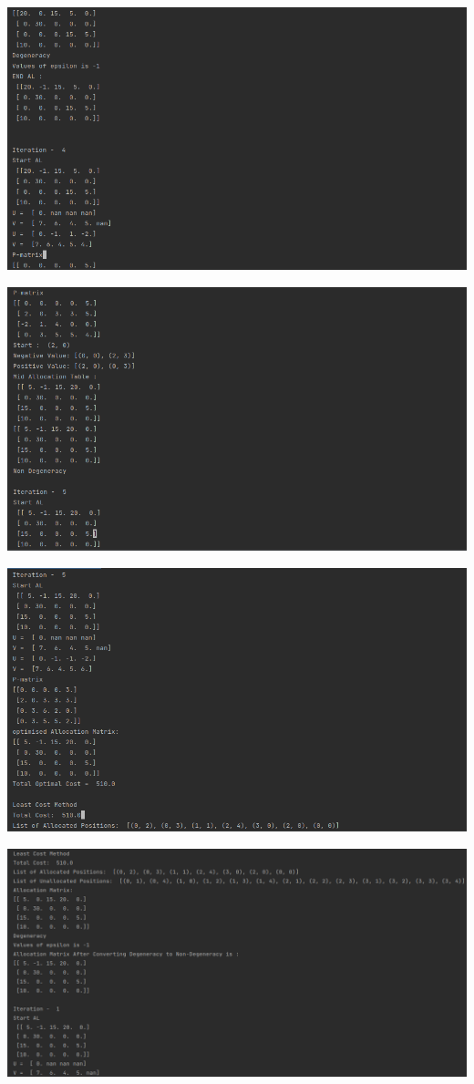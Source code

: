 \documentclass[12pt, letterpaper, twoside]{book}
\begin{document}
\includegraphics[width=550pt]{Output6}

\includegraphics[width=550pt]{Output7}

\includegraphics[width=550pt]{Output8}

\includegraphics[width=550pt]{Output9}
\end{document}
